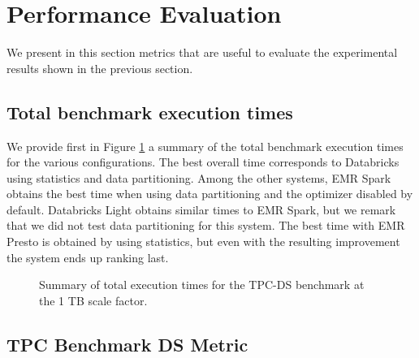 \section{Performance Evaluation}\label{performanceEvaluation}

We present in this section metrics that are useful to evaluate the experimental results shown in the previous section.

\subsection{Total benchmark execution times}\label{summaryTotalTimes}

We provide first in Figure \ref{fig:totalTimesSummary} a summary of the total benchmark execution times for the various configurations. The best overall time corresponds to Databricks using statistics and data partitioning. Among the other systems, EMR Spark obtains the best time when using data partitioning and the optimizer disabled by default. Databricks Light obtains similar times to EMR Spark, but we remark that we did not test data partitioning for this system. The best time with EMR Presto is obtained by using statistics, but even with the resulting improvement the system ends up ranking last.

\begin{figure}
   \begin{center}
   \end{center}
   \caption{Summary of total execution times for the TPC-DS benchmark at the 1 TB scale factor.}
   \label{fig:totalTimesSummary}
\end{figure}

\subsection{TPC Benchmark DS Metric}\label{summaryTpcdsMetric}

